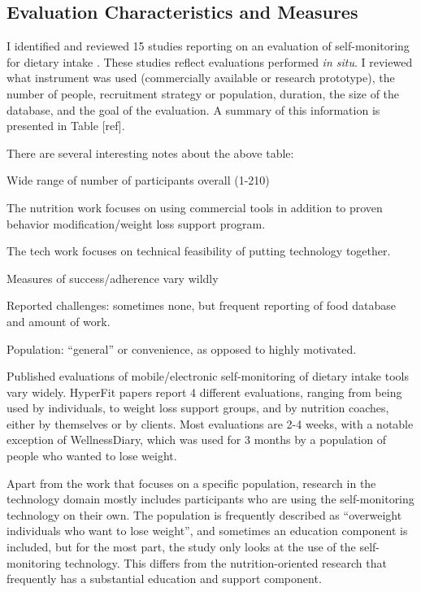 \subsection{Evaluation Characteristics and Measures}
I identified and reviewed 15 studies reporting on an evaluation of self-monitoring for dietary intake \citep{glanz_improving_2006, burke_effect_2011,fukuo_development_2009,atienza_using_2008, yon_personal_2007, acharya_using_2011, arsand_usability_2007,jarvinen_hyperfit:_2008, mattila_mobile_2008, kozakai_dietary_2006, reddy_image_2007, silva_sapofitness:_2011, tsai_usability_2007, wang_development_2006, long_effectiveness_2012}. These studies reflect evaluations performed \textit{in situ}. I reviewed what instrument was used (commercially available or research prototype), the number of people, recruitment strategy or population, duration, the size of the database, and the goal of the evaluation. A summary of this information is presented in Table [ref].  



There are several interesting notes about the above table:
\begin{enumerate*}
\item Wide range of number of participants overall (1-210)
\item The nutrition work focuses on using commercial tools in addition to proven behavior modification/weight loss support program. 
\item The tech work focuses on technical feasibility of putting technology together. 
\item Measures of success/adherence vary wildly 
\item Reported challenges:	sometimes none, but frequent reporting of food database and amount of work. 
\item Population: ``general'' or convenience, as opposed to highly motivated. 

\end{enumerate*}

Published evaluations of mobile/electronic self-monitoring of dietary intake tools vary widely. HyperFit papers report 4 different evaluations, ranging from being used by individuals, to weight loss support groups, and by nutrition coaches, either by themselves or by clients. Most evaluations are 2-4 weeks, with a notable exception of WellnessDiary, which was used for 3 months by a population of people who wanted to lose weight. 

Apart from the work that focuses on a specific population, research in the technology domain mostly includes participants who are using the self-monitoring technology on their own. The population is frequently described as ``overweight individuals who want to lose weight'', and sometimes an education component is included, but for the most part, the study only looks at the use of the self-monitoring technology. This differs from the nutrition-oriented research that frequently has a substantial education and support component. 

